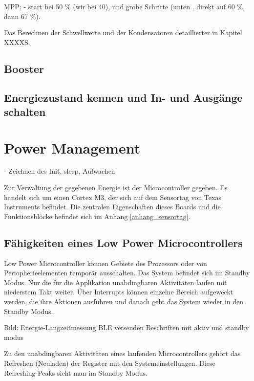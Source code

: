 MPP:
- start bei 50 \% (wir bei 40), und grobe Schritte (unten . direkt auf 60 \%, dann 67 \%). 


Das Berechnen der Schwellwerte und der Kondensatoren detaillierter in Kapitel XXXXS.

\subsection{Booster}

\subsection{Energiezustand kennen und In- und Ausgänge schalten}












\section{Power Management}\label{t_power_management} 
- Zeichnen des Init, sleep, Aufwachen

Zur Verwaltung der gegebenen Energie ist der Microcontroller gegeben. Es handelt sich um einen Cortex M3, der sich auf dem Sensortag von Texas Instruments befindet. Die zentralen Eigenschaften dieses Boards und die Funktionsblöcke befindet sich im Anhang \ref{anhang_sensortag}.

\subsection{Fähigkeiten eines Low Power Microcontrollers}
  
Low Power Microcontroller können Gebiete des Prozessors oder von Periopherieelementen temporär ausschalten. Das System befindet sich im Standby Modus. Nur die für die Applikation unabdingbaren Aktivitäten laufen mit niederstem Takt weiter. Über Interrupts können einzelne Bereich aufgeweckt werden, die ihre Aktionen ausführen und danach geht das System wieder in den Standby Modus.

Bild: Energie-Langzeitmessung BLE versenden
Beschriften mit aktiv und standby modus

Zu den unabdingbaren Aktivitäten eines laufenden Microcontrollers gehört das Refreshen (Neuladen) der Register mit den Systemeinstellungen. Diese Refreshing-Peaks sieht man im Standby Modus.



